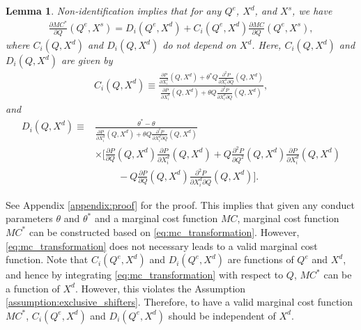 \documentclass[11pt, a4paper]{article}
\newtheorem{lemma}{Lemma}
\theoremstyle{remark}
\begin{document}
\begin{lemma}\label{lemma:non-identification_transformation}
    Non-identification implies that for any $Q^e$, $X^{d}$, and $X^{s}$, we have 
    \begin{align}
        \frac{\partial MC^{*}}{\partial Q}(Q^e, X^{s}) = D_i(Q^e, X^{d}) + C_i(Q^e, X^{d})\frac{\partial MC}{\partial Q}(Q^e, X^{s}), \label{eq:mc_transformation}
    \end{align}
    where $C_i(Q, X^{d})$ and $D_i(Q, X^{d})$ do not depend on $X^{d}$.
    Here, $C_i(Q, X^{d})$ and $D_i(Q, X^{d})$ are given by
    \begin{align}
        C_i(Q, X^{d}) \equiv \frac{\frac{\partial P}{\partial X^{d}_i}(Q, X^{d}) + \theta^{*} Q\frac{\partial^2 P}{\partial X^{d}_{i}\partial Q}(Q, X^{d}) }{\frac{\partial P}{\partial X^{d}_i}(Q, X^{d}) + \theta Q\frac{\partial^2 P}{\partial X^{d}_{i}\partial Q}(Q, X^{d}) },\label{eq:ratio_marginal_revenue}
    \end{align}
    and
    \begin{align}
        D_i(Q, X^{d}) \equiv &\frac{\theta^{*} - \theta}{\frac{\partial P}{\partial X^{d}_i}(Q, X^{d}) + \theta Q\frac{\partial^2 P}{\partial X^{d}_{i}\partial Q}(Q, X^{d})}\\
        & \times \Bigg[\frac{\partial P}{\partial Q}(Q, X^{d}) \frac{\partial P}{\partial X^{d}_i}(Q, X^{d}) + Q\frac{\partial^2 P}{\partial Q^2}(Q, X^{d}) \frac{\partial P}{\partial X^{d}_i}(Q, X^{d})\\
        &\hspace{1cm}- Q \frac{\partial P}{\partial Q}(Q, X^{d}) \frac{\partial^2 P}{\partial X^{d}_i\partial Q}(Q, X^{d}) \Bigg].\label{eq:intercation_derivative_demand}
    \end{align}
\end{lemma}
See Appendix \ref{appendix:proof} for the proof.
This implies that given any conduct parameters $\theta$ and $\theta^{*}$ and a marginal cost function $MC$, marginal cost function $MC^{*}$ can be constructed based on \eqref{eq:mc_transformation}.
However, \eqref{eq:mc_transformation} does not necessary leads to a valid marginal cost function.
Note that $C_i(Q^e, X^{d})$ and $D_i(Q^e, X^{d})$ are functions of $Q^e$ and $X^{d}$, and hence by integrating \eqref{eq:mc_transformation} with respect to $Q$, $MC^{*}$ can be a function of $X^{d}$.
However, this violates the Assumption \ref{assumption:exclusive_shifters}.
Therefore, to have a valid marginal cost function $MC^{*}$, $C_i(Q^e, X^{d})$ and $D_i(Q^e, X^{d})$ should be independent of $X^{d}$.
\end{document}
